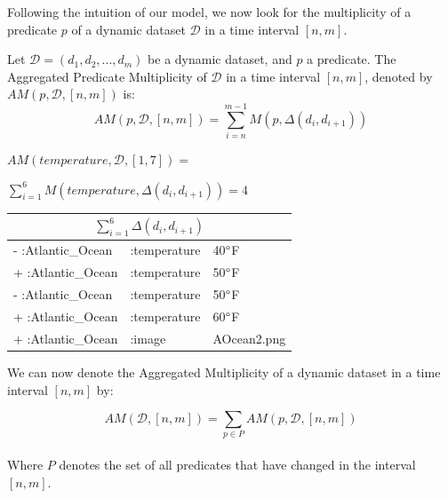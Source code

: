 \documentclass[runningheads]{llncs}
\begin{document}
Following the intuition of our model, we now look for the multiplicity of a predicate $p$ of a dynamic dataset $\mathcal{D}$ in a time interval $[n,m]$.

\begin{definition}
	Let $\mathcal{D} = (d_1, d_2, ..., d_m)$ be a dynamic dataset, and $p$ a predicate. The Aggregated Predicate Multiplicity of $\mathcal{D}$ in a time interval $[n,m]$, denoted by $AM(p, \mathcal{D},[n,m])$ is:
	\begin{equation}
	\label{eq:apm}
	AM(p, \mathcal{D},[n,m]) = \sum_{i=n}^{m-1}M(p, \Delta(d_i, d_{i+1}))
	\end{equation}
\end{definition}

\begin{example}
	\label{ex:apm}
	$AM(temperature, \mathcal{D},[1, 7]) =$
	
	$ \sum_{i=1}^{6}M(temperature, \Delta(d_i, d_{i+1})) = 4$
	
	\begin{center}    
		\begin{tabular}{lll}    \hline
			\multicolumn{3}{c}{$\sum_{i=1}^{6}\Delta(d_i, d_{i+1})$} \\    \hline
			-    :Atlantic\_Ocean  & :temperature   & 40$\degree$F          \\
			+    :Atlantic\_Ocean  & :temperature   & 50$\degree$F          \\            
			-    :Atlantic\_Ocean  & :temperature   & 50$\degree$F          \\
			+    :Atlantic\_Ocean  & :temperature   & 60$\degree$F          \\
			+    :Atlantic\_Ocean  & :image         & AOcean2.png              \\    \hline
		\end{tabular}
	\end{center}
\end{example}

We can now denote the Aggregated Multiplicity of a dynamic dataset in a time interval $[n,m]$ by:

\begin{equation}
\label{eq:am}
AM(\mathcal{D},[n,m]) = \sum_{p \in P}AM(p, \mathcal{D},[n,m])
\end{equation}\\
Where $ P $ denotes the set of all predicates that have changed in the interval $[n,m]$.
\end{document}
